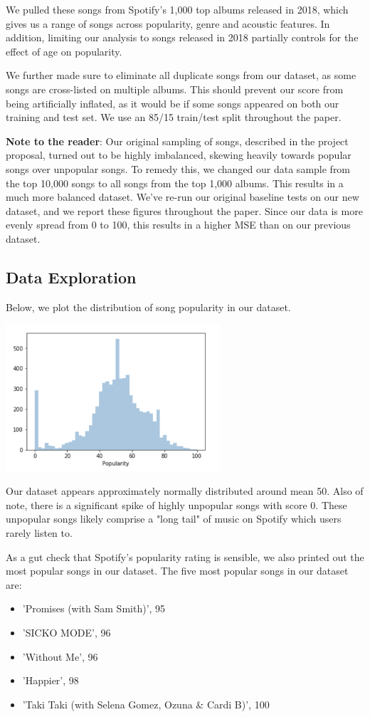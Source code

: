 \documentclass[journal]{IEEEtran}
\begin{document}
We pulled these songs from Spotify's 1,000 top albums released in 2018, which gives us a range of songs across popularity, genre and acoustic features. In addition, limiting our analysis to songs released in 2018 partially controls for the effect of age on popularity.

We further made sure to eliminate all duplicate songs from our dataset, as some songs are cross-listed on multiple albums. This should prevent our score from being artificially inflated, as it would be if some songs appeared on both our training and test set. We use an 85/15 train/test split throughout the paper.

\textbf{Note to the reader}: Our original sampling of songs, described in the project proposal, turned out to be highly imbalanced, skewing heavily towards popular songs over unpopular songs. To remedy this, we changed our data sample from the top 10,000 songs to all songs from the top 1,000 albums. This results in a much more balanced dataset. We've re-run our original baseline tests on our new dataset, and we report these figures throughout the paper. Since our data is more evenly spread from 0 to 100, this results in a higher MSE than on our previous dataset.

\subsection{Data Exploration}

Below, we plot the distribution of song popularity in our dataset.

\includegraphics[width=8cm]{popularity_distribution}

Our dataset appears approximately normally distributed around mean 50. Also of note, there is a significant spike of highly unpopular songs with score 0. These unpopular songs likely comprise a "long tail" of music on Spotify which users rarely listen to.

As a gut check that Spotify's popularity rating is sensible, we also printed out the most popular songs in our dataset. The five most popular songs in our dataset are:
\begin{itemize}
  \item 'Promises (with Sam Smith)', 95
  \item 'SICKO MODE', 96
  \item 'Without Me', 96
  \item 'Happier', 98
  \item 'Taki Taki (with Selena Gomez, Ozuna & Cardi B)', 100
\end{itemize}
\end{document}
